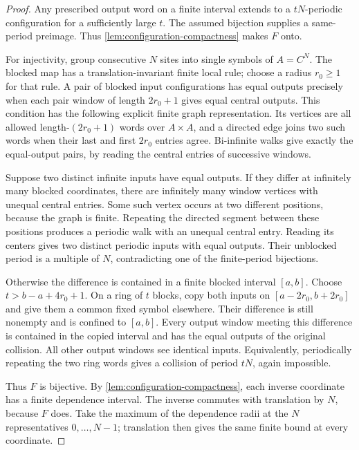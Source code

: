 \documentclass[11pt]{article}
\theoremstyle{definition}
\theoremstyle{remark}
\begin{document}
\begin{proof}
Any prescribed output word on a finite interval extends to a
$tN$-periodic configuration for a sufficiently large $t$.  The assumed
bijection supplies a same-period preimage.  Thus
\cref{lem:configuration-compactness} makes $F$ onto.

For injectivity, group consecutive $N$ sites into single symbols of
$A=C^N$.  The blocked map has a translation-invariant finite local rule;
choose a radius $r_0\ge1$ for that rule.  A pair of blocked input
configurations has equal outputs precisely when each pair window of
length $2r_0+1$ gives equal central outputs.  This condition has the
following explicit finite graph representation.  Its vertices are all
allowed length-$(2r_0+1)$ words over $A\times A$, and a directed edge
joins two such words when their last and first $2r_0$ entries agree.
Bi-infinite walks give exactly the equal-output pairs, by reading
the central entries of successive windows.

Suppose two distinct infinite inputs have equal outputs.  If they differ
at infinitely many blocked coordinates, there are infinitely many window
vertices with unequal central entries.  Some such vertex occurs at
two different positions, because the graph is finite.  Repeating the
directed segment between these positions produces a periodic walk
with an unequal central entry.  Reading its centers gives two distinct
periodic inputs with equal outputs.  Their unblocked period is a multiple
of $N$, contradicting one of the finite-period bijections.

Otherwise the difference is contained in a finite blocked interval
$[a,b]$.  Choose $t>b-a+4r_0+1$.  On a ring of $t$ blocks, copy both
inputs on $[a-2r_0,b+2r_0]$ and give them a common fixed symbol
elsewhere.  Their difference is still nonempty and is confined to
$[a,b]$.  Every output window meeting this difference is contained
in the copied interval and has the equal outputs of the original
collision.  All other output windows see identical inputs.  Equivalently,
periodically repeating the two ring words gives a collision of period
$tN$, again impossible.

Thus $F$ is bijective.  By \cref{lem:configuration-compactness}, each
inverse coordinate has a finite dependence interval.  The inverse
commutes with translation by $N$, because $F$ does.  Take the maximum
of the dependence radii at the $N$ representatives $0,\ldots,N-1$;
translation then gives the same finite bound at every coordinate.
\end{proof}
\end{document}
